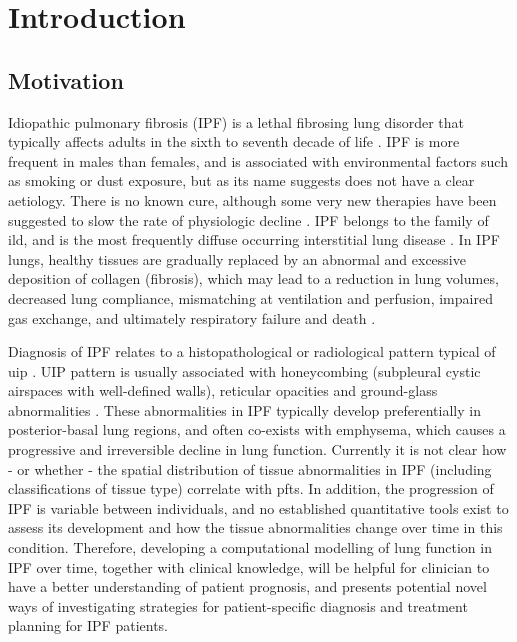 \chapter{Introduction} \label{Yuwen_Introduction}
\section{Motivation}
Idiopathic pulmonary fibrosis (IPF) is a lethal fibrosing lung disorder that typically affects adults in the sixth to seventh decade of life \citep{meltzer2008idiopathic,king2011idiopathic}. IPF is more frequent in males than females, and is associated with environmental factors such as smoking or dust exposure, but as its name suggests does not have a clear aetiology. There is no known cure, although some very new therapies have been suggested to slow the rate of physiologic decline \citep{raghu2011official}. IPF belongs to the family of \gls{ild}, and is the most frequently diffuse occurring interstitial lung disease \citep{meltzer2008idiopathic}. In IPF lungs, healthy tissues are gradually replaced by an abnormal and excessive deposition of collagen (fibrosis), which may lead to a reduction in lung volumes, decreased lung compliance, mismatching at ventilation and perfusion, impaired gas exchange, and ultimately respiratory failure and death \citep{richeldi2017idiopathic}.

Diagnosis of IPF relates to a histopathological or radiological pattern typical of \gls{uip} \citep{raghu2011official,xaubet2017idiopathic}. UIP pattern is usually associated with honeycombing (subpleural cystic airspaces with well-defined walls),  reticular opacities and ground-glass abnormalities \citep{raghu2011official,richeldi2017idiopathic}. These abnormalities in IPF typically develop preferentially in posterior-basal lung regions, and often co-exists with emphysema, which causes a progressive and irreversible decline in lung function. Currently it is not clear how - or whether - the spatial distribution of tissue abnormalities in IPF (including classifications of tissue type) correlate with \gls{pfts}. In addition, the progression of IPF is variable between individuals, and no established quantitative tools exist to assess its development and how the tissue abnormalities change over time in this condition. Therefore, developing a computational modelling of lung function in IPF over time, together with clinical knowledge, will be helpful for clinician to have a better understanding of patient prognosis, and presents potential novel ways of investigating strategies for patient-specific diagnosis and treatment planning for IPF patients.


